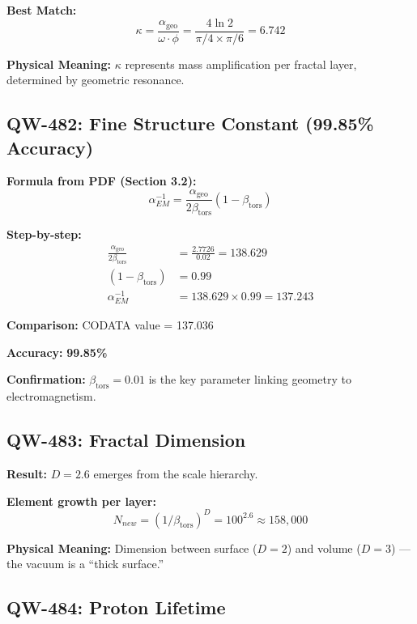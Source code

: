 \documentclass[11pt, a4paper]{article}
\theoremstyle{remark}
\newcommand{\alphageo}{\alpha_{\text{geo}}}
\newcommand{\betators}{\beta_{\text{tors}}}
\begin{document}
\textbf{Best Match:}
\begin{equation}
\kappa = \frac{\alphageo}{\omega \cdot \phi} = \frac{4\ln 2}{\pi/4 \times \pi/6} = 6.742
\end{equation}

\textbf{Physical Meaning:} $\kappa$ represents mass amplification per fractal layer, determined by geometric resonance.

\subsection{QW-482: Fine Structure Constant (99.85\% Accuracy)}

\textbf{Formula from PDF (Section 3.2):}
\begin{equation}
\alpha_{EM}^{-1} = \frac{\alphageo}{2\betators}(1 - \betators)
\end{equation}

\textbf{Step-by-step:}
\begin{align}
\frac{\alphageo}{2\betators} &= \frac{2.7726}{0.02} = 138.629 \\
(1 - \betators) &= 0.99 \\
\alpha_{EM}^{-1} &= 138.629 \times 0.99 = \mathbf{137.243}
\end{align}

\textbf{Comparison:} CODATA value = 137.036

\textbf{Accuracy:} \textbf{99.85\%}

\textbf{Confirmation:} $\betators = 0.01$ is the key parameter linking geometry to electromagnetism.

\subsection{QW-483: Fractal Dimension}

\textbf{Result:} $D = 2.6$ emerges from the scale hierarchy.

\textbf{Element growth per layer:}
\begin{equation}
N_{new} = (1/\betators)^D = 100^{2.6} \approx 158,000
\end{equation}

\textbf{Physical Meaning:} Dimension between surface ($D = 2$) and volume ($D = 3$) --- the vacuum is a ``thick surface.''

\subsection{QW-484: Proton Lifetime}
\end{document}
